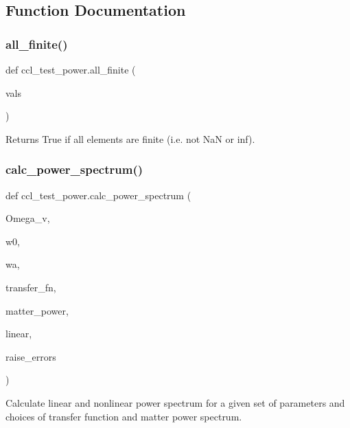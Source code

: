 \subsection{Function Documentation}
\mbox{\label{namespaceccl__test__power_a3be01a8e90fe6de68e6f4560c2ea3e17}} 
\subsubsection{\texorpdfstring{all\+\_\+finite()}{all\_finite()}}
{\footnotesize\ttfamily def ccl\+\_\+test\+\_\+power.\+all\+\_\+finite (\begin{DoxyParamCaption}\item[{}]{vals }\end{DoxyParamCaption})}

\begin{DoxyVerb}Returns True if all elements are finite (i.e. not NaN or inf).
\end{DoxyVerb}
 \mbox{\label{namespaceccl__test__power_a62e19844920cdba6f368f81b3ac3452a}} 
\subsubsection{\texorpdfstring{calc\+\_\+power\+\_\+spectrum()}{calc\_power\_spectrum()}}
{\footnotesize\ttfamily def ccl\+\_\+test\+\_\+power.\+calc\+\_\+power\+\_\+spectrum (\begin{DoxyParamCaption}\item[{}]{Omega\+\_\+v,  }\item[{}]{w0,  }\item[{}]{wa,  }\item[{}]{transfer\+\_\+fn,  }\item[{}]{matter\+\_\+power,  }\item[{}]{linear,  }\item[{}]{raise\+\_\+errors }\end{DoxyParamCaption})}

\begin{DoxyVerb}Calculate linear and nonlinear power spectrum for a given set of parameters
and choices of transfer function and matter power spectrum.
\end{DoxyVerb}
 \mbox{\label{namespaceccl__test__power_a6a72c958a22a41eee6524ff79a2c68b1}} 
